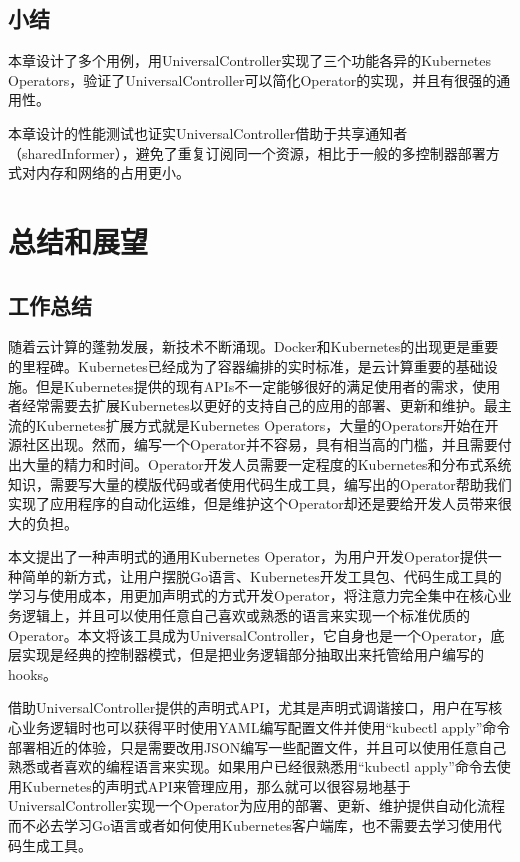 \documentclass[macfonts,master]{njuthesis}
\begin{document}
\section{小结}
本章设计了多个用例，用UniversalController实现了三个功能各异的Kubernetes Operators，验证了UniversalController可以简化Operator的实现，并且有很强的通用性。

本章设计的性能测试也证实UniversalController借助于共享通知者（sharedInformer），避免了重复订阅同一个资源，相比于一般的多控制器部署方式对内存和网络的占用更小。
\chapter{总结和展望}\label{chapter_concludes}
\section{工作总结}
随着云计算的蓬勃发展，新技术不断涌现。Docker和Kubernetes的出现更是重要的里程碑。Kubernetes已经成为了容器编排的实时标准，是云计算重要的基础设施。但是Kubernetes提供的现有APIs不一定能够很好的满足使用者的需求，使用者经常需要去扩展Kubernetes以更好的支持自己的应用的部署、更新和维护。最主流的Kubernetes扩展方式就是Kubernetes Operators，大量的Operators开始在开源社区出现。然而，编写一个Operator并不容易，具有相当高的门槛，并且需要付出大量的精力和时间。Operator开发人员需要一定程度的Kubernetes和分布式系统知识，需要写大量的模版代码或者使用代码生成工具，编写出的Operator帮助我们实现了应用程序的自动化运维，但是维护这个Operator却还是要给开发人员带来很大的负担。

本文提出了一种声明式的通用Kubernetes Operator，为用户开发Operator提供一种简单的新方式，让用户摆脱Go语言、Kubernetes开发工具包、代码生成工具的学习与使用成本，用更加声明式的方式开发Operator，将注意力完全集中在核心业务逻辑上，并且可以使用任意自己喜欢或熟悉的语言来实现一个标准优质的Operator。本文将该工具成为UniversalController，它自身也是一个Operator，底层实现是经典的控制器模式，但是把业务逻辑部分抽取出来托管给用户编写的hooks。


借助UniversalController提供的声明式API，尤其是声明式调谐接口，用户在写核心业务逻辑时也可以获得平时使用YAML编写配置文件并使用``kubectl apply''命令部署相近的体验，只是需要改用JSON编写一些配置文件，并且可以使用任意自己熟悉或者喜欢的编程语言来实现。如果用户已经很熟悉用``kubectl apply''命令去使用Kubernetes的声明式API来管理应用，那么就可以很容易地基于UniversalController实现一个Operator为应用的部署、更新、维护提供自动化流程而不必去学习Go语言或者如何使用Kubernetes客户端库，也不需要去学习使用代码生成工具。
\end{document}
